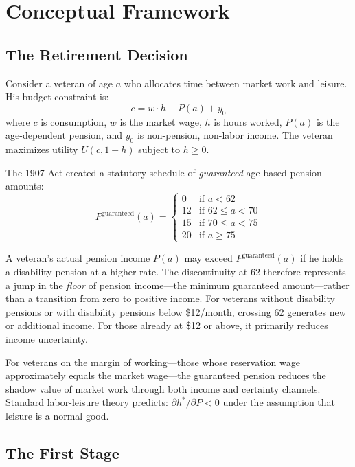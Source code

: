 \documentclass[12pt]{article}
\begin{document}
\section{Conceptual Framework}

\subsection{The Retirement Decision}

Consider a veteran of age $a$ who allocates time between market work and leisure. His budget constraint is:
\begin{equation}
c = w \cdot h + P(a) + y_0
\end{equation}
where $c$ is consumption, $w$ is the market wage, $h$ is hours worked, $P(a)$ is the age-dependent pension, and $y_0$ is non-pension, non-labor income. The veteran maximizes utility $U(c, 1-h)$ subject to $h \geq 0$.

The 1907 Act created a statutory schedule of \textit{guaranteed} age-based pension amounts:
\begin{equation}
P^{\text{guaranteed}}(a) = \begin{cases}
0 & \text{if } a < 62 \\
12 & \text{if } 62 \leq a < 70 \\
15 & \text{if } 70 \leq a < 75 \\
20 & \text{if } a \geq 75
\end{cases}
\end{equation}

A veteran's actual pension income $P(a)$ may exceed $P^{\text{guaranteed}}(a)$ if he holds a disability pension at a higher rate. The discontinuity at 62 therefore represents a jump in the \textit{floor} of pension income---the minimum guaranteed amount---rather than a transition from zero to positive income. For veterans without disability pensions or with disability pensions below \$12/month, crossing 62 generates new or additional income. For those already at \$12 or above, it primarily reduces income uncertainty.

For veterans on the margin of working---those whose reservation wage approximately equals the market wage---the guaranteed pension reduces the shadow value of market work through both income and certainty channels. Standard labor-leisure theory predicts: $\partial h^* / \partial P < 0$ under the assumption that leisure is a normal good.

\subsection{The First Stage}
\end{document}
